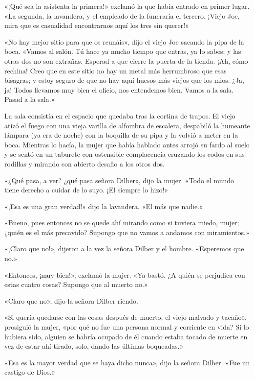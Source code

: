 \documentclass{novela}
\begin{document}
 «¡Qué sea la asistenta la primera!» exclamó la que había entrado en primer lugar. «La segunda, la lavandera, y el empleado de la funeraria el tercero. ¡Viejo Joe, mira que es casualidad encontrarnos aquí los tres sin querer!»

 «No hay mejor sitio para que os reunáis», dijo el viejo Joe sacando la pipa de la boca. «Vamos al salón. Tú hace ya mucho tiempo que entras, ya lo sabes; y las otras dos no son extrañas. Esperad a que cierre la puerta de la tienda. ¡Ah, cómo rechina! Creo que en este sitio no hay un metal más herrumbroso que esas bisagras; y estoy seguro de que no hay aquí huesos más viejos que los mios. ¿Ja, ja! Todos llevamos muy bien el oficio, nos entendemos bien. Vamos a la sala. Pasad a la sala.»

 La sala consistía en el espacio que quedaba tras la cortina de trapos. El viejo atizó el fuego con una vieja varilla de alfombra de escalera, despabiló la humeante lámpara (ya era de noche) con la boquilla de su pipa y la volvió a meter en la boca. Mientras lo hacía, la mujer que había hablado antes arrojó su fardo al suelo y se sentó en un taburete con ostensible complacencia cruzando los codos en sus rodillas y mirando con abierto desafio a los otros dos.

 «¿Qué pasa, a ver? ¿qué pasa señora Dilber», dijo la mujer. «Todo el mundo tiene derecho a cuidar de lo suyo. ¡El siempre lo hizo!»

 «¡Esa es una gran verdad!» dijo la lavandera. «El más que nadie.»

 «Bueno, pues entonces no se quede ahí mirando como si tuviera miedo, mujer; ¿quién es el más precavido? Supongo que no vamos a andamos con miramientos.»

 «¡Claro que no!», dijeron a la vez la señora Dilber y el hombre. «Esperemos que no.»

 «Entonces, ¡muy bien!», exclamó la mujer. «Ya bastó. ¿A quién se perjudica con estas cuatro cosas? Supongo que al muerto no.»

 «Claro que no», dijo la señora Dilber riendo.

 «Si quería quedarse con las cosas después de muerto, el viejo malvado y tacaño», prosiguió la mujer, «por qué no fue una persona normal y corriente en vida? Si lo hubiera sido, alguien se habría ocupado de él cuando estaba tocado de muerte en vez de estar ahí tirado, solo, dando las últimas boqueadas.»

 «Esa es la mayor verdad que se haya dicho nunca», dijo la señora Dilber. «Fue un castigo de Dios.»
\end{document}
